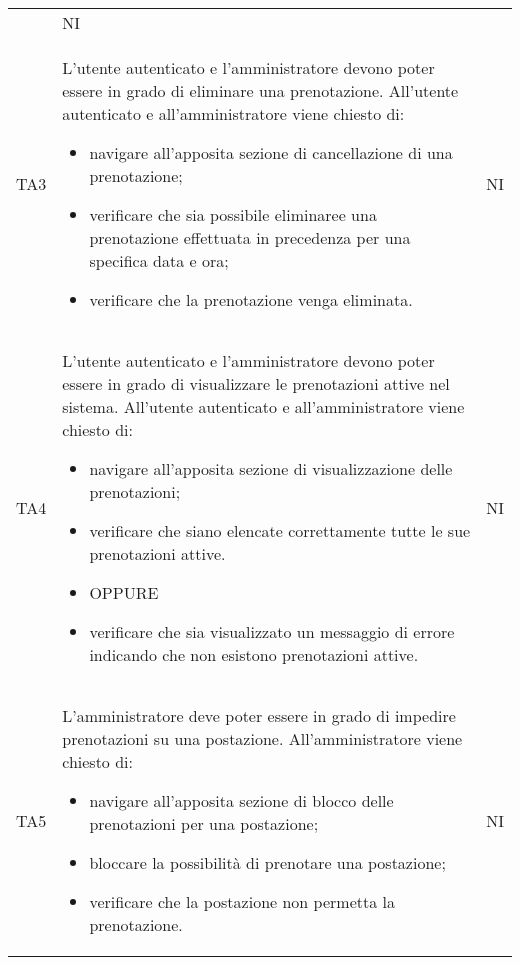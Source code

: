 {\begin{longtable}{ c C{11cm} c }
\begin{itemize}
        \end{itemize}&
        NI\\
        TA3&
        L'utente autenticato e l'amministratore devono poter essere in grado di eliminare una prenotazione.\newline
        All'utente autenticato e all'amministratore viene chiesto di:
        \begin{itemize}
            \item navigare all'apposita sezione di cancellazione di una prenotazione;
            \item verificare che sia possibile eliminaree una prenotazione effettuata in precedenza per una specifica data e ora;
            \item verificare che la prenotazione venga eliminata.
        \end{itemize}&
        NI\\
        TA4&
        L'utente autenticato e l'amministratore devono poter essere in grado di visualizzare le prenotazioni attive nel sistema.\newline
        All'utente autenticato e all'amministratore viene chiesto di:
        \begin{itemize}
            \item navigare all'apposita sezione di visualizzazione delle prenotazioni;
            \item verificare che siano elencate correttamente tutte le sue prenotazioni attive.
            \item [] OPPURE
            \item verificare che sia visualizzato un messaggio di errore indicando che non esistono prenotazioni attive.
        \end{itemize}&
        NI\\
        TA5&
        L'amministratore deve poter essere in grado di impedire prenotazioni su una postazione.\newline
        All'amministratore viene chiesto di:
        \begin{itemize}
            \item navigare all'apposita sezione di blocco delle prenotazioni per una postazione;
            \item bloccare la possibilità di prenotare una postazione;
            \item verificare che la postazione non permetta la prenotazione.
        \end{itemize}&
        NI\\

\end{longtable}}
